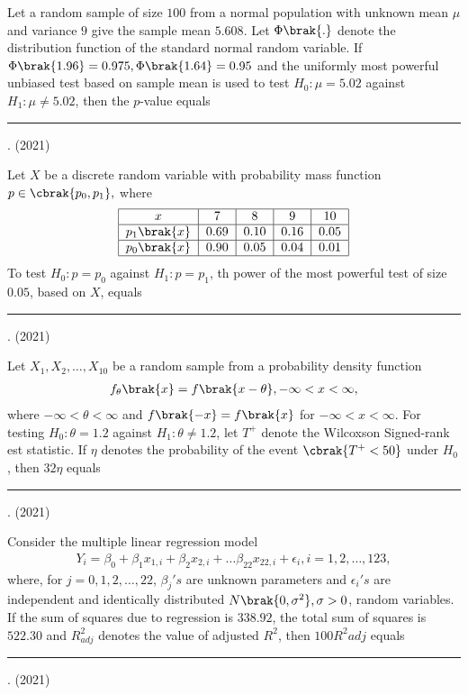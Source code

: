 	\item Let a random sample of size $100$ from a normal population with unknown mean $\mu$ and variance $9$ give the sample mean $5.608$. Let $\Phi\brak{.}$ denote the distribution function of the standard normal random variable. If $\Phi\brak{1.96}=0.975,\Phi\brak{1.64}=0.95$ and the uniformly most powerful unbiased test based on sample mean is used to test $H_0:\mu =5.02$ against $H_1:\mu \neq 5.02$, then the $p$-value equals \rule{1cm}{0.15mm} .
	\hfill{(2021)}
    \item Let $X$ be a discrete random variable with probability mass function $p\in \cbrak{p_0,p_1},$ where
    \begin{align*}
       \begin{tabular}{|c|c|c|c|c|}
    \hline
    $x$ & 7 & 8 & 9 & 10  \\
    \hline
    $p_1\brak{x}$ & 0.69 & 0.10 & 0.16 & 0.05 \\
    \hline
    $p_0\brak{x}$ & 0.90 & 0.05 & 0.04 & 0.01 \\
    \hline
\end{tabular}
\end{align*}
         To test $H_0:p=p_0$ against $H_1:p=p_1$, th power of the most powerful test of size $0.05$, based on $X$, equals \rule{1cm}{0.15mm} .
         \hfill{(2021)}
    \item Let $X_1,X_2,\ldots,X_{10}$ be a random sample from a probability density function 
    \begin{align*}
        f_\theta \brak{x} =f\brak{x-\theta}, -\infty<x<\infty,
    \end{align*}
    where $-\infty<\theta<\infty$ and $f\brak{-x}=f\brak{x}$ for $-\infty <x<\infty$. For testing $H_0:\theta=1.2$ against $H_1:\theta \neq1.2$, let $T^+$ denote the Wilcoxson Signed-rank est statistic. If $\eta$ denotes the probability of the event $\cbrak{T^+<50}$ under $H_0$, then $32\eta$ equals \rule{1cm}{0.15mm} .
    \hfill{(2021)}
    \item Consider the multiple linear regression model
         \begin{align*}
             Y_i=\beta_0+\beta_1x_{1,i}+\beta_2x_{2,i}+\ldots \beta_{22}x_{22,i}+\epsilon_i, i=1,2,\ldots,123,
         \end{align*}
         where, for $j=0,1,2,\ldots,22$, $\beta_j's$ are unknown parameters and $\epsilon_i's$ are independent and identically distributed $N\brak{0,\sigma^2},\sigma>0$, random variables.\\
         If the sum of squares due to regression is $338.92$, the total sum of squares is $522.30$ and $R_{adj}^2$ denotes the value of adjusted $R^2$, then $100R^2{adj}$ equals \rule{1cm}{0.15mm} .
         \hfill{(2021)}


